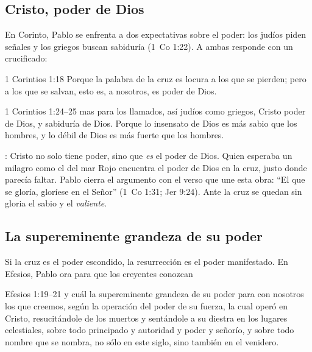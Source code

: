 
\subsection{Cristo, poder de Dios}

En Corinto, Pablo se enfrenta a dos expectativas sobre el poder: los judíos piden señales y los griegos buscan sabiduría (1~Co 1:22). A ambas responde con un crucificado:

\begin{verso}{1 Corintios 1:18}
Porque la palabra de la cruz es locura a los que se pierden; pero a los que se salvan, esto es, a nosotros, es poder de Dios.
\end{verso}

\begin{verso}{1 Corintios 1:24–25}
mas para los llamados, así judíos como griegos, Cristo poder de Dios, y sabiduría de Dios. Porque lo insensato de Dios es más sabio que los hombres, y lo débil de Dios es más fuerte que los hombres.
\end{verso}

: Cristo no solo tiene poder, sino que \emph{es} el poder de Dios. Quien esperaba un milagro como el del mar Rojo encuentra el poder de Dios en la cruz, justo donde parecía faltar. Pablo cierra el argumento con el verso que une esta obra: ``El que se gloría, gloríese en el Señor'' (1~Co 1:31; Jer 9:24). Ante la cruz se quedan sin gloria el sabio y el \emph{valiente}.

\subsection{La supereminente grandeza de su poder}

Si la cruz es el poder escondido, la resurrección es el poder manifestado. En Efesios, Pablo ora para que los creyentes conozcan

\begin{verso}{Efesios 1:19–21}
y cuál la supereminente grandeza de su poder para con nosotros los que creemos, según la operación del poder de su fuerza, la cual operó en Cristo, resucitándole de los muertos y sentándole a su diestra en los lugares celestiales, sobre todo principado y autoridad y poder y señorío, y sobre todo nombre que se nombra, no sólo en este siglo, sino también en el venidero.
\end{verso}

